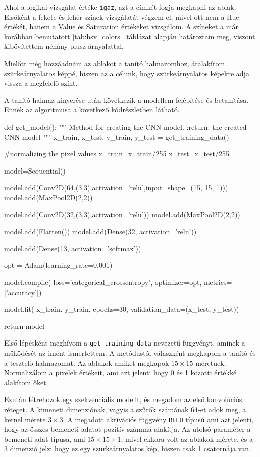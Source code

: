 Ahol a logikai vizsgálat értéke \texttt{igaz}, azt a címkét fogja megkapni az ablak. Elsőként a fekete és fehér színek vizsgálatát végzem el, mivel ott nem a Hue értékét, hanem a Value és Saturation értékeket vizsgálom. A színeket a már korábban bemutatott \ref{tab:hsv_colors}. táblázat alapján határoztam meg, viszont kibővítettem néhány plusz árnyalattal.

Mielőtt még hozzáadnám az ablakot a tanító halmazomhoz, átalakítom szürkeárnyalatos képpé, hiszen az a célunk, hogy szürkeárnyalatos képekre adja vissza a megfelelő színt.

A tanító halmaz kinyerése után következik a modellem felépítése és betanítása. Ennek az algoritmusa a következő kódrészletben látható.
\begin{python}
def get_model():
    """
    Method for creating the CNN model.
    :return: the created CNN model
    """
    x_train, x_test, y_train, y_test = get_training_data()

    #normalizing the pixel values
    x_train=x_train/255
    x_test=x_test/255

    model=Sequential()

    model.add(Conv2D(64,(3,3),activation='relu',input_shape=(15, 15, 1)))
    model.add(MaxPool2D(2,2))

    model.add(Conv2D(32,(3,3),activation='relu'))
    model.add(MaxPool2D(2,2))

    model.add(Flatten())
    model.add(Dense(32, activation='relu'))

    model.add(Dense(13, activation='softmax'))

    opt = Adam(learning_rate=0.001)

    model.compile(
        loss='categorical_crossentropy',
        optimizer=opt,
        metrics=['accuracy'])

    model.fit(
        x_train,
        y_train,
        epochs=30,
        validation_data=(x_test, y_test))

    return model
\end{python}

Első lépésként meghívom a \texttt{get\_training\_data} nevezetű függvényt, aminek a működését az imént ismertettem. A metódustól válaszként megkapom a tanító és a tesztelő halmazomat. Az ablakok amiket megkapok $15 \times 15$ méretűek. Normalizálom a pixelek értékeit, ami azt jelenti hogy 0 és 1 közötti értékké alakítom őket.

Ezután létrehozok egy szekvenciális modellt, és megadom az első konvolúciós réteget. A kimeneti dimenziónak, vagyis a szűrők számának 64-et adok meg, a kernel mérete $3 \times 3$. A megadott aktivációs függvény \texttt{RELU} típusú ami azt jelenti, hogy az összes bemeneti adatot pozitív számmá alakítja. Az utolsó paraméter a bemeneti adat típusa, ami $15 \times 15 \times 1$, mivel ekkora volt az ablakok mérete, és a 3 dimenzió jelzi hogy ez egy szürkeárnyalatos kép, hiszen csak 1 csatornája van.

